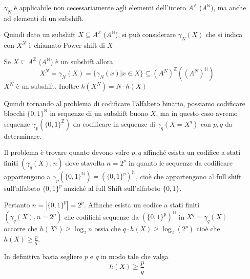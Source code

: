 \begin{nota}
    $\gamma_N$ è applicabile non cecessariamente agli elementi dell'intero $A^\mathbb{Z}$ ($A^\mathbb{N}$),
    ma anche ad elementi di un subshift.
\end{nota}

Quindi dato un subshift $X\subseteq A^{\mathbb{Z}}$ ($A^{\mathbb{N}}$), si può
considerare $\gamma_N(X)$ che si indica con $X^N$ è chiamato Power shift di $X$

\begin{teorema}
    Se $X\subseteq A^\mathbb{Z }$ ($A^\mathbb{N}$) è un subshift allora
    $$X^N= \gamma_N(X)=\{\gamma_N(x)|x\in X\}\subseteq (A^N)^\mathbb{Z} ((A^N)^\mathbb{N})$$
    $X^N$ è un subshift. Inoltre $h(X^N)=N\cdot h(X)$
\end{teorema}

Quindi tornando al problema di codificare l'alfabeto binario, possiamo codificare
blocchi $\{0,1\}^\mathbb{N}$ in sequenze di un subshift buono $X$, ma in questo
caso avremo sequenze
$\gamma_p(\{0,1\}^\mathbb{Z})$ da codificare in sequenze di $\gamma_q(X=X^q)$
con $p,q$ da determinare.

Il problema è trovare quanto devono valre $p,q$ affinché esista un codifice a stati
finiti $(\gamma_q(X),n)$ dove stavolta $n=2^p$ in quanto le sequenze da codificare
appartengono a $\gamma_p(\{0,1\}^\mathbb{N}) = (\{0,1\}^p)^\mathbb{N}$, cioè
che appartengono al full shift sull'alfabeto $\{0,1\}^p$ anziché al full Shift
sull'alfabeto $\{0,1\}$.

Pertanto $n=|\{0,1\}^p| = 2^p$. Affinche esista un codice a stati finiti
$(\gamma_q(X), n =2^p )$ che codifichi sequenze da $(\{0,1\}^p)^\mathbb{N}$ in
$X^q=\gamma_q(X)$ occorre che $h(X^q)\ge \log_2n$ ossia che $q\cdot h(X)\ge \log_2 (2^p)$
cioè che $h(X)\ge \frac{p}{q}$.

In definitiva basta segliere $p$ e $q$ in modo tale che valga
$$h(X)\ge \frac{p}{q} $$